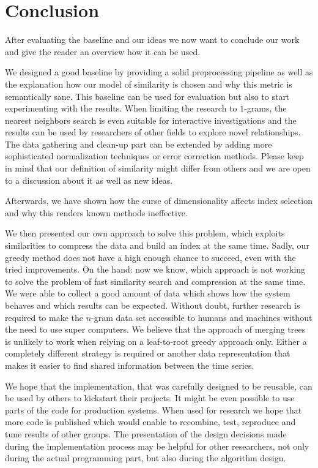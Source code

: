 \chapter{Conclusion}
\label{ch:Conclusion}

After evaluating the baseline and our ideas we now want to conclude our work and give the reader an overview how it can be used.

We designed a good baseline by providing a solid preprocessing pipeline as well as the explanation how our model of similarity is chosen and why this metric is semantically sane. This baseline can be used for evaluation but also to start experimenting with the results. When limiting the research to $1$-grams, the nearest neighbors search is even suitable for interactive investigations and the results can be used by researchers of other fields to explore novel relationships. The data gathering and clean-up part can be extended by adding more sophisticated normalization techniques or error correction methods. Please keep in mind that our definition of similarity might differ from others and we are open to a discussion about it as well as new ideas.

Afterwards, we have shown how the curse of dimensionality affects index selection and why this renders known methods ineffective.

We then presented our own approach to solve this problem, which exploits similarities to compress the data and build an index at the same time. Sadly, our greedy method does not have a high enough chance to succeed, even with the tried improvements. On the hand: now we know, which approach is not working to solve the problem of fast similarity search and compression at the same time. We were able to collect a good amount of data which shows how the system behaves and which results can be expected. Without doubt, further research is required to make the $n$-gram data set accessible to humans and machines without the need to use super computers. We believe that the approach of merging trees is unlikely to work when relying on a leaf-to-root greedy approach only. Either a completely different strategy is required or another data representation that makes it easier to find shared information between the time series.

We hope that the implementation, that was carefully designed to be reusable, can be used by others to kickstart their projects. It might be even possible to use parts of the code for production systems. When used for research we hope that more code is published which would enable to recombine, test, reproduce and tune results of other groups. The presentation of the design decisions made during the implementation process may be helpful for other researchers, not only during the actual programming part, but also during the algorithm design.

